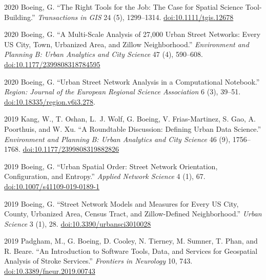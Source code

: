 \documentclass[12pt,letterpaper]{report}
\begin{document}
\begin{tablist}
        \item[2020] \tab Boeing, G. \enquote{The Right Tools for the Job: The Case for Spatial Science Tool-Building.} \textit{Transactions in GIS} 24 (5), 1299--1314. \href{https://doi.org/10.1111/tgis.12678}{doi:10.1111/tgis.12678}

        \item[2020] \tab Boeing, G. \enquote{A Multi-Scale Analysis of 27,000 Urban Street Networks: Every US City, Town, Urbanized Area, and Zillow Neighborhood.} \textit{Environment and Planning B: Urban Analytics and City Science} 47 (4), 590--608. \href{https://doi.org/10.1177/2399808318784595}{doi:10.1177/2399808318784595}

        \item[2020] \tab Boeing, G. \enquote{Urban Street Network Analysis in a Computational Notebook.} \textit{Region: Journal of the European Regional Science Association} 6 (3), 39--51. \href{https://doi.org/10.18335/region.v6i3.278}{doi:10.18335/region.v6i3.278}.

        \item[2019] \tab Kang, W., T. Oshan, L.~J. Wolf, G. Boeing, V. Frias-Martinez, S. Gao, A. Poorthuis, and W. Xu. \enquote{A Roundtable Discussion: Defining Urban Data Science.} \textit{Environment and Planning B: Urban Analytics and City Science} 46 (9), 1756--1768. \href{https://doi.org/10.1177/2399808319882826}{doi:10.1177/2399808319882826}

        \item[2019] \tab Boeing, G. \enquote{Urban Spatial Order: Street Network Orientation, Configuration, and Entropy.} \textit{Applied Network Science} 4 (1), 67. \href{https://doi.org/10.1007/s41109-019-0189-1}{doi:10.1007/s41109-019-0189-1}

        \item[2019] \tab Boeing, G. \enquote{Street Network Models and Measures for Every US City, County, Urbanized Area, Census Tract, and Zillow-Defined Neighborhood.} \textit{Urban Science} 3 (1), 28. \href{https://doi.org/10.3390/urbansci3010028}{doi:10.3390/urbansci3010028}

        \item[2019] \tab Padgham, M., G. Boeing, D. Cooley, N. Tierney, M. Sumner, T. Phan, and R. Beare. \enquote{An Introduction to Software Tools, Data, and Services for Geospatial Analysis of Stroke Services.} \textit{Frontiers in Neurology} 10, 743. \href{https://doi.org/10.3389/fneur.2019.00743}{doi:10.3389/fneur.2019.00743}


\end{tablist}
\end{document}
